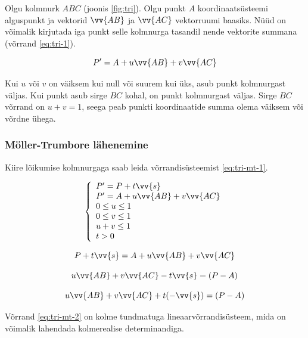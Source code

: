 \documentclass[a4paper,12pt]{report}
\renewcommand{\vec}[1]{\vv{#1}}
\begin{document}
Olgu kolmnurk \(ABC\) (joonis \ref{fig:tri}). Olgu punkt \(A\) koordinaatsüsteemi alguspunkt ja
vektorid \(\vec{AB}\) ja \(\vec{AC}\) vektorruumi baasiks. Nüüd on
võimalik kirjutada iga punkt selle kolmnurga tasandil nende vektorite
summana (võrrand \ref{eq:tri-1}).

\begin{equation} \label{eq:tri-1}
P' = A + u\vec{AB} + v\vec{AC}
\end{equation}

Kui \(u\) või \(v\) on väiksem kui null või suurem kui üks, asub punkt
kolmnurgast väljas. Kui punkt asub sirge \(BC\) kohal, on punkt
kolmnurgast väljas. Sirge \(BC\) võrrand on \(u + v = 1\), seega peab
punkti koordinaatide summa olema väiksem või võrdne ühega.

\subsubsection{Möller-Trumbore lähenemine}
Kiire lõikumise kolmnurgaga saab leida võrrandisüsteemist \ref{eq:tri-mt-1}.

\begin{equation} \label{eq:tri-mt-1}
\left\{
\begin{array}{l}
P' = P + t\vec s \\
P' = A + u\vec{AB} + v\vec{AC} \\
0 \leq u \leq 1 \\
0 \leq v \leq 1 \\
u + v \leq 1 \\
t > 0 
\end{array}
\right.
\end{equation}

\[P + t\vec s = A + u\vec{AB} + v\vec{AC}\]

\[u\vec{AB} + v\vec{AC} -t\vec s = (P - A)\]

\begin{equation} \label{eq:tri-mt-2}
u\vec{AB} + v\vec{AC} + t(-\vec s) = (P - A)
\end{equation}

Võrrand \ref{eq:tri-mt-2} on kolme tundmatuga lineaarvõrrandisüsteem,
mida on võimalik lahendada kolmerealise determinandiga. \cite{MT97}
\end{document}
